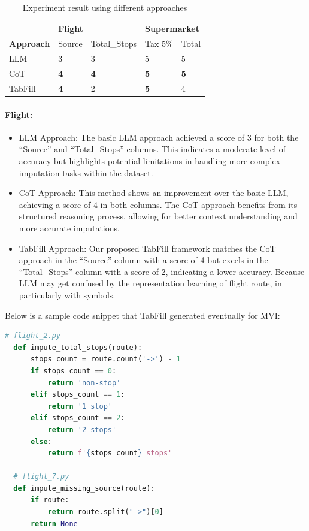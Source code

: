 \documentclass[sigconf]{acmart}
\begin{document}
\begin{table}[h]
  \caption{Experiment result using different approaches}
  \label{tab:result}
  \begin{tabular}{@{}lllll@{}}
    \toprule
                      & \multicolumn{2}{l}{Flight} & \multicolumn{2}{l}{Supermarket} \\ \midrule
    \textbf{Approach} & Source      & Total\_Stops & Tax 5\%        & Total          \\ \midrule
    LLM               & 3           & 3            & 5              & 5              \\
    CoT               & \textbf{4}  & \textbf{4}   & \textbf{5}     & \textbf{5}     \\
    TabFill           & \textbf{4}  & 2            & \textbf{5}     & 4              \\ \bottomrule
    \end{tabular}
\end{table}

\paragraph{Flight:}
\begin{itemize}
  \item LLM Approach: The basic LLM approach achieved a score of 3 for both the “Source” and “Total\_Stops” columns. This indicates a moderate level of accuracy but highlights potential limitations in handling more complex imputation tasks within the dataset.
  \item CoT Approach: This method shows an improvement over the basic LLM, achieving a score of 4 in both columns. The CoT approach benefits from its structured reasoning process, allowing for better context understanding and more accurate imputations.
  \item TabFill Approach: Our proposed TabFill framework matches the CoT approach in the “Source” column with a score of 4 but excels in the “Total\_Stops” column with a score of 2, indicating a lower accuracy. Because LLM may get confused by the representation learning of flight route, in particularly with symbols.
\end{itemize}

Below is a sample code snippet that TabFill generated eventually for MVI:
\begin{lstlisting}[language=Python, caption=Python function to impute missing values in Flight, label={code:flight}]
  # flight_2.py
  def impute_total_stops(route):
      stops_count = route.count('->') - 1
      if stops_count == 0:
          return 'non-stop'
      elif stops_count == 1:
          return '1 stop'
      elif stops_count == 2:
          return '2 stops'
      else:
          return f'{stops_count} stops'
  
  # flight_7.py
  def impute_missing_source(route):
      if route:
          return route.split("->")[0]
      return None
  
\end{lstlisting}
  
\end{document}
